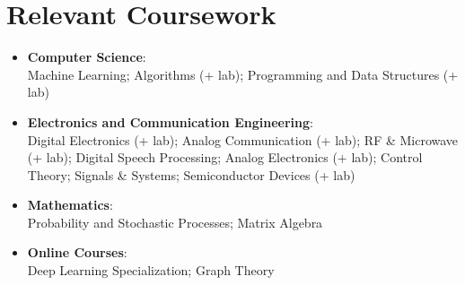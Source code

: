 \documentclass[letterpaper,11pt]{article}
\newcommand{\resumeItem}[2]{
  \item\small{
    \textbf{#1}{: #2 \vspace{-2pt}}
  }
}
\newcommand{\resumeSubItem}[2]{\resumeItem{#1}{#2}\vspace{-4pt}}
\newcommand{\resumeSubHeadingListStart}{\begin{itemize}[leftmargin=*]}
\newcommand{\resumeSubHeadingListEnd}{\end{itemize}}
\begin{document}
 \section{Relevant Coursework}
  \resumeSubHeadingListStart
    \resumeSubItem{Computer Science}
      {\\Machine Learning; Algorithms (+ lab); Programming and Data Structures (+ lab)}
    \resumeSubItem{Electronics and Communication Engineering}
      {\\Digital Electronics (+ lab); Analog Communication (+ lab); RF \& Microwave (+ lab); Digital Speech Processing; Analog Electronics (+ lab); Control Theory; Signals \& Systems; Semiconductor Devices (+ lab)}
    \resumeSubItem{Mathematics}
      {\\Probability and Stochastic Processes; Matrix Algebra}
    \resumeSubItem{Online Courses}
      {\\Deep Learning Specialization; Graph Theory}
  \resumeSubHeadingListEnd

      
  
\end{document}
